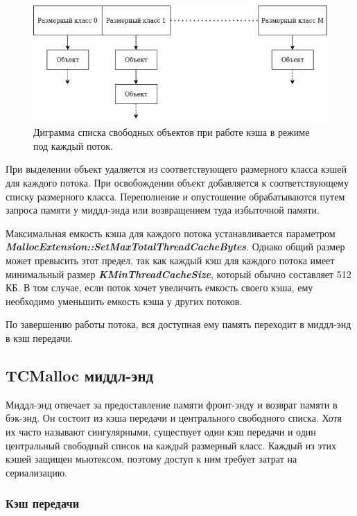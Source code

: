 \begin{figure}[!h]
	\begin{center}
		\includegraphics[scale=0.6]{images/tcmalloc-per-thread.png}
		\caption{Диграмма списка свободных объектов при работе кэша в режиме под каждый поток.}
		\label{tcmalloc-per-thread}
	\end{center}
\end{figure}

При выделении объект удаляется из соответствующего размерного класса кэшей для каждого потока. При освобождении объект добавляется к соответствующему списку размерного класса. Переполнение и опустошение обрабатываются путем запроса памяти у миддл-энда или возвращением туда избыточной памяти.

Максимальная емкость кэша для каждого потока устанавливается параметром \textbf{\textit{MallocExtension::SetMaxTotalThreadCacheBytes}}. Однако общий размер может превысить этот предел, так как каждый кэш для каждого потока имеет минимальный размер \textbf{\textit{KMinThreadCacheSize}}, который обычно составляет 512 КБ. В том случае, если поток хочет увеличить емкость своего кэша, ему необходимо уменьшить емкость кэша у других потоков.

По завершению работы потока, вся доступная ему память переходит в миддл-энд в кэш передачи.

\subsection{TCMalloc миддл-энд}

Миддл-энд отвечает за предоставление памяти фронт-энду и возврат памяти в бэк-энд. Он состоит из кэша передачи и центрального свободного списка. Хотя их часто называют сингулярными, существует один кэш передачи и один центральный свободный список на каждый размерный класс. Каждый из этих кэшей защищен мьютексом, поэтому доступ к ним требует затрат на сериализацию.

\subsubsection{Кэш передачи}

